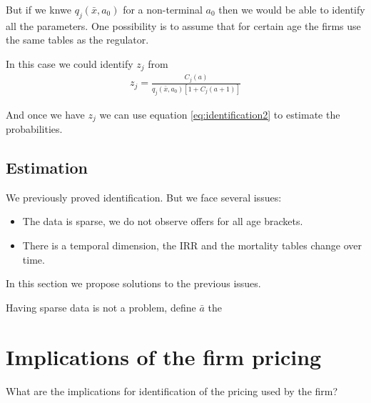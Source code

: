\documentclass[12pt]{article}
\theoremstyle{plain}
\theoremstyle{plain}
\begin{document}
But if we knwe $ q_j(\bar{x},a_0)$ for a non-terminal $a_0$ then we would be able to identify all the parameters. One possibility is to assume that for certain age the firms use the same tables as the regulator. 

In this case we could identify $z_j$ from 
\begin{align}\label{eq:identification3}
     z_j  =\frac{C_j(a)}{ q_j(\bar{x}, a_0)[1+C_j(a+1)]}
\end{align}

And once we have $z_j$ we can use equation \ref{eq:identification2} to estimate the probabilities. 








  


\newpage





 \subsection{Estimation}

We previously proved identification. But we face several issues: 
\begin{itemize}
    \item The data is sparse, we do not observe offers for all age brackets. 

    \item There is a temporal dimension, the IRR and the mortality tables change over time. 
\end{itemize}

In this section we propose solutions to the previous issues. 

Having sparse data is not a problem, define $\bar{a}$ the 

 
\newpage



 
\section{Implications of the firm pricing }
What are the implications for identification of the pricing used by the firm? 
\end{document}
